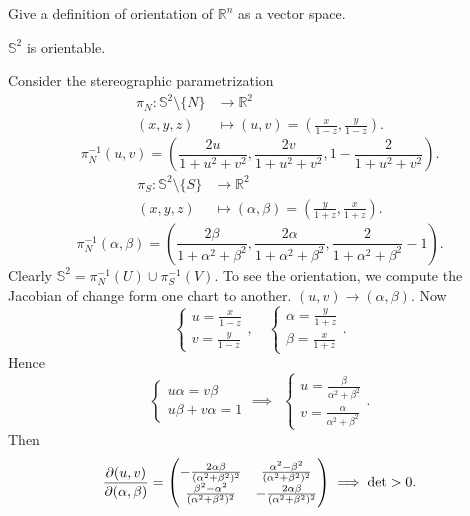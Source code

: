 \begin{exercise}
    Give a definition of orientation of \(\mathbb{R}^n\) as a vector space.
\end{exercise}

\begin{example}
    \(\mathbb{S}^2\) is orientable.
\end{example}

Consider the stereographic parametrization
\begin{align*}
    \pi_N\colon \mathbb{S}^2\setminus\{N\} &\longrightarrow \mathbb{R}^2 \\
    (x,y,z) &\longmapsto (u,v)=(\frac{x}{1-z},\frac{y}{1-z})
.\end{align*} \[
    \pi_N^{-1}(u,v)=(\frac{2u}{1+u^2+v^2},\frac{2v}{1+u^2+v^2},1-\frac{2}{1+u^2+v^2})
.\] \begin{align*}
    \pi_S\colon \mathbb{S}^2\setminus\{S\} &\longrightarrow \mathbb{R}^2 \\
    (x,y,z) &\longmapsto (\alpha,\beta)=(\frac{y}{1+z},\frac{x}{1+z})
.\end{align*} \[
    \pi_N^{-1}(\alpha,\beta)=(\frac{2\beta}{1+\alpha^2+\beta^2},\frac{2\alpha}
    {1+\alpha^2+\beta^2},\frac{2}{1+\alpha^2+\beta^2}-1)
.\] Clearly \(\mathbb{S}^2=\pi_N^{-1}(U)\cup \pi_S^{-1}(V)\). To see the orientation,
we compute the Jacobian of change form one chart to another. \((u,v)\to (\alpha,\beta
)\). Now \[
    \begin{cases}
        u=\frac{x}{1-z} \\
        v=\frac{y}{1-z}
    \end{cases},\quad
    \begin{cases}
        \alpha=\frac{y}{1+z} \\
        \beta=\frac{x}{1+z}
    \end{cases}
.\] Hence \[
    \begin{cases}
        u\alpha=v\beta \\
        u\beta+v\alpha=1
    \end{cases}\implies \ \ 
    \begin{cases}
        u=\frac{\beta}{\alpha^2+\beta^2} \\
        v=\frac{\alpha}{\alpha^2+\beta^2}
    \end{cases}
.\] Then \[
    \pdv{(u,v)}{(\alpha,\beta)}=\begin{pmatrix}
        -\frac{2\alpha\beta}{(\alpha^2+\beta^2)^2} &
        \frac{\alpha^2-\beta^2}{(\alpha^2+\beta^2)^2} \\
        \frac{\beta^2-\alpha^2}{(\alpha^2+\beta^2)^2} &
        -\frac{2\alpha\beta}{(\alpha^2+\beta^2)^2}
    \end{pmatrix}\implies \det>0
.\] 


